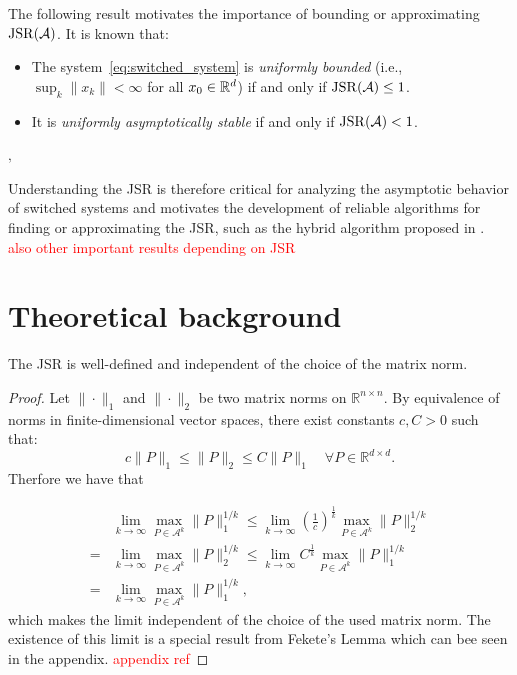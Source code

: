 The following result motivates the importance of bounding or approximating $\operatorname{JSR}(\mathcal{A})$. It is known that:
\begin{itemize}
    \item The system~\eqref{eq:switched_system} is \emph{uniformly bounded} (i.e., $\sup_k \|x_k\| < \infty$ for all $x_0 \in \mathbb{R}^d$) if and only if $\operatorname{JSR}(\mathcal{A}) \leq 1$.
    \item It is \emph{uniformly asymptotically stable} if and only if $\operatorname{JSR}(\mathcal{A}) < 1$. 
\end{itemize}
\citep{blondelSurveyComputationalComplexity2000}‚

Understanding the JSR is therefore critical for analyzing the asymptotic behavior of switched systems and motivates the development of reliable algorithms for finding or approximating the JSR, such as the hybrid algorithm proposed in \citep{mejstrikHybridApproachJoint2024}.
\textcolor{red}{also other important results depending on JSR}

\section{Theoretical background}

\begin{theorem}
    The JSR is well-defined and independent of the choice of the matrix norm.
\end{theorem}

\begin{proof}
Let $\| \cdot \|_1$   and $ \| \cdot \|_2 $ be two matrix norms on $ \mathbb{R}^{n \times n} $. By equivalence of norms in finite-dimensional vector spaces, there exist constants $ c, C > 0 $ such that:
$$
c \|P\|_1 \leq \|P\|_2 \leq C \|P\|_1 \quad \forall P \in \mathbb{R}^{d \times d}
.$$
Therfore we have that

\begin{align*}
& \lim_{k \to \infty} \max_{P \in \mathcal{A}^k} \|P\|_{1}^{1/k} 
\le  \lim_{k \to \infty} {\left(\frac{1}{c}\right)}^{\frac{1}{k}} \max_{P \in \mathcal{A}^k} \|P\|_{2}^{1/k} \\
= & \lim_{k \to \infty} \max_{P \in \mathcal{A}^k} \|P\|_{2}^{1/k} 
\le  \lim_{k \to \infty} {C}^{\frac{1}{k}} \max_{P \in \mathcal{A}^k} \|P\|_{1}^{1/k}\\
= & \lim_{k \to \infty} \max_{P \in \mathcal{A}^k} \|P\|_{1}^{1/k},
\end{align*}
which makes the limit independent of the choice of the used matrix norm. 
The existence of this limit is a special result from Fekete's Lemma which can bee seen in the appendix. \textcolor{red}{appendix ref} 
\end{proof}

